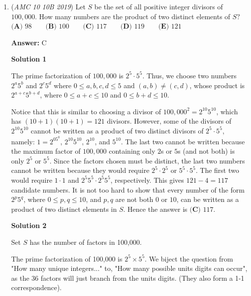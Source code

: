 \begin{enumerate}
 $2-B=1/4B$ —> $2=5/4B$ —> $B=8/5$
$A=1/4(8/5)=2/5$, $|A-B|=|2/5-8/5|=|-6/5|= \boxed{(C)6/5}$
\begin{verbatim}
- WB0s0n
\end{verbatim}




	\item (\textit{AMC 10 10B 2019}) Let $S$ be the set of all positive integer divisors of $100,000.$ How many numbers are the product of two distinct elements of $S?$
$\textbf{(A) }98\qquad\textbf{(B) }100\qquad\textbf{(C) }117\qquad\textbf{(D) }119\qquad\textbf{(E) }121$

 \textbf{Answer: }C



\textbf{Solution 1}

The prime factorization of $100,000$ is $2^5 \cdot 5^5$. Thus, we choose two numbers $2^a5^b$ and $2^c5^d$ where $0 \le a,b,c,d \le 5$ and $(a,b) \neq (c,d)$, whose product is $2^{a+c}5^{b+d}$, where $0 \le a+c \le 10$ and $0 \le b+d \le 10$.

 Notice that this is similar to choosing a divisor of $100,000^2 = 2^{10}5^{10}$, which has $(10+1)(10+1) = 121$ divisors. However, some of the divisors of $2^{10}5^{10}$ cannot be written as a product of two distinct divisors of $2^5 \cdot 5^5$, namely: $1 = 2^05^0$, $2^{10}5^{10}$, $2^{10}$, and $5^{10}$. The last two cannot be written because the maximum factor of $100,000$ containing only $2$s or $5$s (and not both) is only $2^5$ or $5^5$. Since the factors chosen must be distinct, the last two numbers cannot be written because they would require $2^5 \cdot 2^5$ or $5^5 \cdot 5^5$. The first two would require $1 \cdot 1$ and $2^{5}5^{5} \cdot 2^{5}5^{5}$, respectively. This gives $121-4 = 117$ candidate numbers. It is not too hard to show that every number of the form $2^p5^q$, where $0 \le p, q \le 10$, and $p,q$ are not both $0$ or $10$, can be written as a product of two distinct elements in $S$. Hence the answer is $\boxed{\textbf{(C) } 117}$.

 



\textbf{Solution 2}

Set \( S \) has the number of factors in 100,000. 

 The prime factorization of 100,000 is \( 2^5 \times 5^5 \). We biject the question from "How many unique integers..." to, "How many possible units digits can occur", as the 36 factors will just branch from the units digits. (They also form a 1-1 correspondence).


\end{enumerate}
